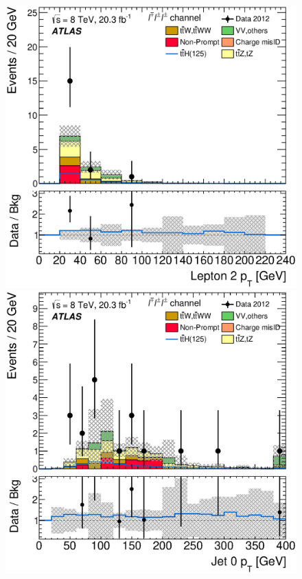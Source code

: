 \begin{figure}[!htbp]
\begin{minipage}[h]{0.4\textwidth}
  \end{minipage}\hfill
  \begin{minipage}[h]{0.4\textwidth}
    \centering \includegraphics[width=\textwidth]{figs/results/results_new/3lep_SR_SortLep2Pt}
  \end{minipage}\hfill
  \begin{minipage}[h]{0.4\textwidth}
    \centering \includegraphics[width=\textwidth]{figs/results/results_new/3lep_SR_jet00_Pt}

\end{minipage}
\end{figure}
